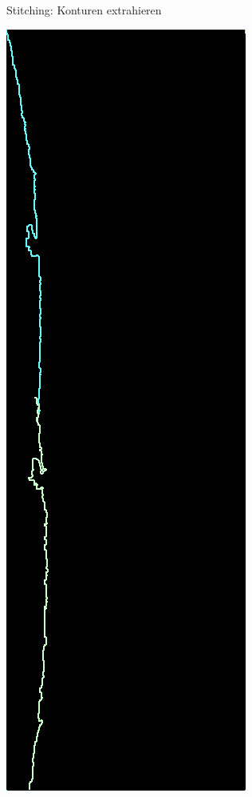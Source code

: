 \documentclass[../slides.tex]{subfiles}
\begin{document}
\begin{frame}{Stitching: Konturen extrahieren}
\begin{minipage}[H]{.15\textwidth}
        \includegraphics[width=\textwidth]{img_niklas/15_match.png}

\end{minipage}
\end{frame}
\end{document}
